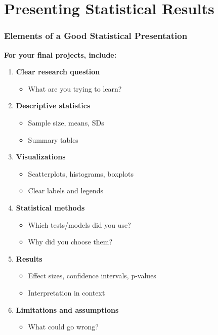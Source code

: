 \documentclass{beamer}
\begin{document}
\section{Presenting Statistical Results}

\begin{frame}
\frametitle{Elements of a Good Statistical Presentation}
\textbf{For your final projects, include:}

\vspace{0.3cm}
\begin{enumerate}
\item \textbf{Clear research question}
  \begin{itemize}
  \item What are you trying to learn?
  \end{itemize}

\item \textbf{Descriptive statistics}
  \begin{itemize}
  \item Sample size, means, SDs
  \item Summary tables
  \end{itemize}

\item \textbf{Visualizations}
  \begin{itemize}
  \item Scatterplots, histograms, boxplots
  \item Clear labels and legends
  \end{itemize}

\item \textbf{Statistical methods}
  \begin{itemize}
  \item Which tests/models did you use?
  \item Why did you choose them?
  \end{itemize}

\item \textbf{Results}
  \begin{itemize}
  \item Effect sizes, confidence intervals, p-values
  \item Interpretation in context
  \end{itemize}

\item \textbf{Limitations and assumptions}
  \begin{itemize}
  \item What could go wrong?
  \end{itemize}
\end{enumerate}
\end{frame}
\end{document}
